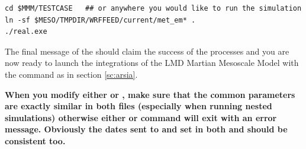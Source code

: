 \begin{verbatim}
cd $MMM/TESTCASE   ## or anywhere you would like to run the simulation
ln -sf $MESO/TMPDIR/WRFFEED/current/met_em* .
./real.exe
\end{verbatim}

\sk
The final message of the  should claim the success of the processes and you are now ready to launch the integrations of the LMD Martian Mesoscale Model with the  command as in section \ref{sc:arsia}.

\sk
\begin{finger}
\item \textbf{ When you modify either  or , make sure that the common parameters are exactly similar in both files (especially when running nested simulations) otherwise either  or  command will exit with an error message. Obviously the dates sent to  and set in both  and  should be consistent too. }
\end{finger}

\clearemptydoublepage

